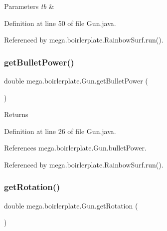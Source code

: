 \begin{DoxyParams}{Parameters}
{\em tb} & \\
\hline
\end{DoxyParams}


Definition at line 50 of file Gun.\+java.



Referenced by mega.\+boirlerplate.\+Rainbow\+Surf.\+run().

\mbox{\label{classmega_1_1boirlerplate_1_1_gun_a42bc32a089d174c7d18d932e349cd7a7}} 
\subsubsection{\texorpdfstring{get\+Bullet\+Power()}{getBulletPower()}}
{\footnotesize\ttfamily double mega.\+boirlerplate.\+Gun.\+get\+Bullet\+Power (\begin{DoxyParamCaption}{ }\end{DoxyParamCaption})}

\begin{DoxyReturn}{Returns}

\end{DoxyReturn}


Definition at line 26 of file Gun.\+java.



References mega.\+boirlerplate.\+Gun.\+bullet\+Power.



Referenced by mega.\+boirlerplate.\+Rainbow\+Surf.\+run().

\mbox{\label{classmega_1_1boirlerplate_1_1_gun_a0fdb9fc6e7c7756de11c783df6c3d90e}} 
\subsubsection{\texorpdfstring{get\+Rotation()}{getRotation()}}
{\footnotesize\ttfamily double mega.\+boirlerplate.\+Gun.\+get\+Rotation (\begin{DoxyParamCaption}{ }\end{DoxyParamCaption})}

